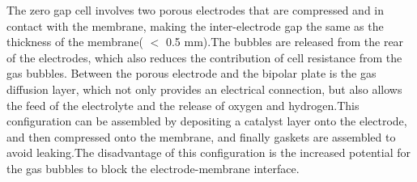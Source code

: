 The zero gap cell involves two porous electrodes that are compressed and in contact with the membrane, making the inter-electrode gap the same as the thickness of the membrane( $<$  0.5 mm).The bubbles are released from the rear of the electrodes, which also reduces the contribution of cell resistance from the gas bubbles. Between the porous electrode and the bipolar plate is the gas diffusion layer, which not only provides an electrical connection, but also allows the feed of the electrolyte and the release of oxygen and hydrogen.This configuration can be assembled by depositing a catalyst layer onto the electrode, and then compressed onto the membrane, and finally gaskets are assembled to avoid leaking.\cite{zerogap}The disadvantage of this configuration is the increased potential for the gas bubbles to block the electrode-membrane interface.
